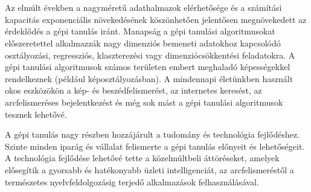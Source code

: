 \section{\bevezetes}


Az elmúlt években a nagyméretű adathalmazok elérhetősége és a számítási kapacitás exponenciális növekedésének köszönhetően jelentősen megnövekedett az érdeklődés a gépi tanulás iránt. Manapság a gépi tanulási algoritmusokat előszeretettel alkalmazzák nagy dimenziós bemeneti adatokhoz kapcsolódó osztályozási, regressziós, klaszterezési vagy dimenziócsökkentési feladatokra. A gépi tanulási algoritmusok számos területen embert meghaladó képességekkel rendelkeznek (például képosztályozásban). A mindennapi életünkben használt okos eszközökön a kép- és beszédfelismerést, az internetes keresést, az arcfelismeréses bejelentkezést és még sok mást a gépi tanulási algoritmusok tesznek lehetővé. \cite{test}


A gépi tanulás nagy részben hozzájárult a tudomány és technológia fejlődéshez. Szinte minden iparág és vállalat felismerte a gépi tanulás előnyeit és lehetőségeit. A technológia fejlődése lehetővé tette a közelmúltbeli áttöréseket, amelyek elősegítik a gyorsabb és hatékonyabb üzleti intelligenciát, az arcfelismeréstől a természetes nyelvfeldolgozásig terjedő alkalmazások felhasználásával.


